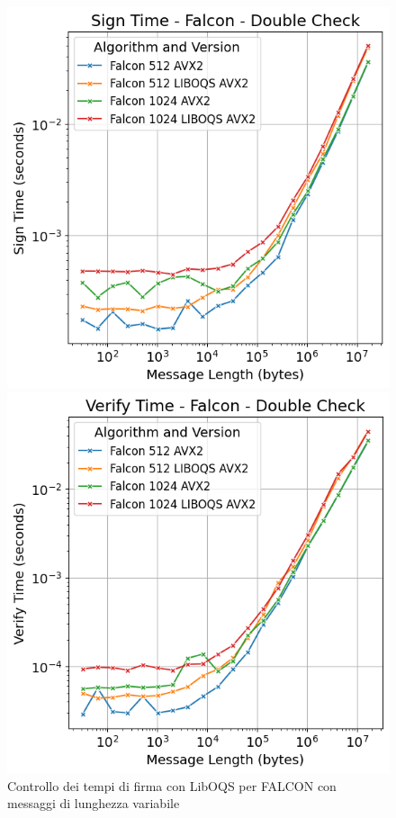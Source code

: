 \begin{figure}[H]
    \centering
    \begin{minipage}{0.45\textwidth}
        \centering
        \includegraphics[width=1\textwidth]{Immagini/20240822_i9/Time_Sign/double_check/TM_SG_falcon.png}
        \caption{Controllo dei tempi di firma con LibOQS per FALCON con messaggi di lunghezza variabile}
        \label{fig:TM_SG_falcon}
    \end{minipage}\hfill
    \begin{minipage}{0.45\textwidth}
        \centering
        \includegraphics[width=1\textwidth]{Immagini/20240822_i9/Time_Verify/double_check/TM_VF_falcon.png}

\end{minipage}
\end{figure}
